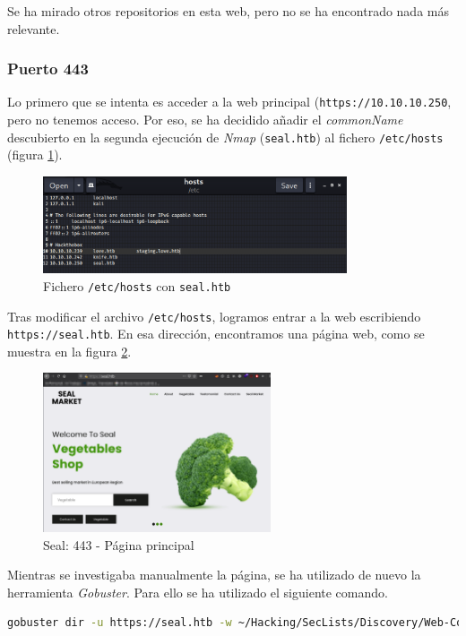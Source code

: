 Se ha mirado otros repositorios en esta web, pero no se ha encontrado nada más relevante.

\subsubsection{Puerto 443}

Lo primero que se intenta es acceder a la web principal (\texttt{https://10.10.10.250}, pero no tenemos acceso. Por eso, se ha decidido añadir el \textit{commonName} descubierto en la segunda ejecución de \textit{Nmap} (\texttt{seal.htb}) al fichero \texttt{/etc/hosts} (figura \ref{fig:seal-etc-hosts}).

\begin{figure}[h]
    \centering
    \includegraphics[width=0.80\textwidth]{images/machines/seal/etc-hosts.png}
    \caption{Fichero \texttt{/etc/hosts} con \texttt{seal.htb}}
    \label{fig:seal-etc-hosts}
\end{figure}

Tras modificar el archivo \texttt{/etc/hosts}, logramos entrar a la web escribiendo \texttt{\\https://seal.htb}. En esa dirección, encontramos una página web, como se muestra en la figura \ref{fig:seal-443-main}.

\begin{figure}[h]
    \centering
    \includegraphics[width=0.60\textwidth]{images/machines/seal/seal-main.png}
    \caption{Seal: 443 - Página principal}
    \label{fig:seal-443-main}
\end{figure}

Mientras se investigaba manualmente la página, se ha utilizado de nuevo la herramienta \textit{Gobuster}\cite{gobuster}. Para ello se ha utilizado el siguiente comando.
\begin{lstlisting}[language=bash]
gobuster dir -u https://seal.htb -w ~/Hacking/SecLists/Discovery/Web-Content/tomcat.txt -k | anew 03_gobuster_433.txt
\end{lstlisting}


